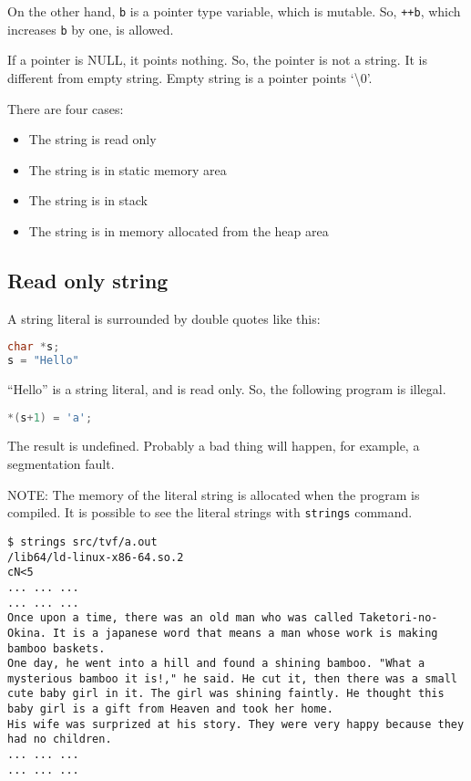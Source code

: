 On the other hand, \passthrough{\lstinline!b!} is a pointer type
variable, which is mutable. So, \passthrough{\lstinline!++b!}, which
increases \passthrough{\lstinline!b!} by one, is allowed.

If a pointer is NULL, it points nothing. So, the pointer is not a
string. It is different from empty string. Empty string is a pointer
points `\textbackslash0'.

There are four cases:

\begin{itemize}
\tightlist
\item
  The string is read only
\item
  The string is in static memory area
\item
  The string is in stack
\item
  The string is in memory allocated from the heap area
\end{itemize}

\subsection{Read only string}\label{read-only-string}

A string literal is surrounded by double quotes like this:

\begin{lstlisting}[language=C]
char *s;
s = "Hello"
\end{lstlisting}

``Hello'' is a string literal, and is read only. So, the following
program is illegal.

\begin{lstlisting}[language=C]
*(s+1) = 'a';
\end{lstlisting}

The result is undefined. Probably a bad thing will happen, for example,
a segmentation fault.

NOTE: The memory of the literal string is allocated when the program is
compiled. It is possible to see the literal strings with
\passthrough{\lstinline!strings!} command.

\begin{lstlisting}
$ strings src/tvf/a.out
/lib64/ld-linux-x86-64.so.2
cN<5
... ... ...
... ... ...
Once upon a time, there was an old man who was called Taketori-no-Okina. It is a japanese word that means a man whose work is making bamboo baskets.
One day, he went into a hill and found a shining bamboo. "What a mysterious bamboo it is!," he said. He cut it, then there was a small cute baby girl in it. The girl was shining faintly. He thought this baby girl is a gift from Heaven and took her home.
His wife was surprized at his story. They were very happy because they had no children. 
... ... ...
... ... ...
\end{lstlisting}

